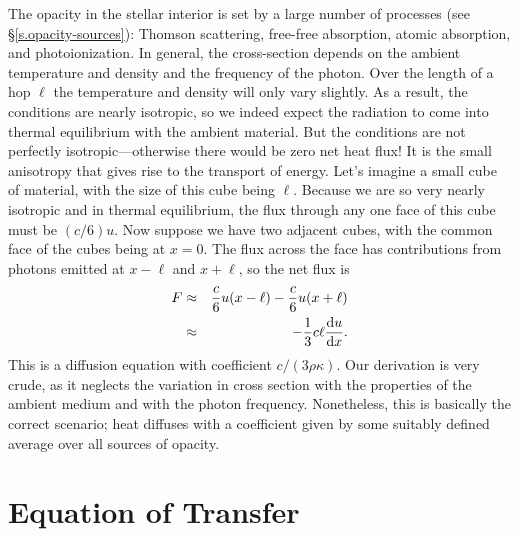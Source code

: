 The opacity in the stellar interior is set by a large number of processes (see \S\ref{s.opacity-sources}): Thomson scattering, free-free absorption, atomic absorption, and photoionization.  In general, the cross-section depends on the ambient temperature and density and the frequency of the photon. 
Over the length of a hop $\ell$ the temperature and density will only vary slightly.  As a result, the conditions are nearly isotropic, so we indeed expect the radiation to come into thermal equilibrium with the ambient material.  But the conditions are not perfectly isotropic---otherwise there would be zero net heat flux!  It is the small anisotropy that gives rise to the transport of energy.  Let's imagine a small cube of material, with the size of this cube being $\ell$.  Because we are so very nearly isotropic and in thermal equilibrium, the flux through any one face of this cube must be $(c/6)u$.  Now suppose we have two adjacent cubes, with the common face of the cubes being at $x=0$.  The flux across the face has contributions from photons emitted at $x-\ell$ and $x+\ell$, so the net flux is
\begin{eqnarray}
	F &\approx& \frac{c}{6} u(x-\ell) - \frac{c}{6} u (x+\ell)\nonumber \\
	&\approx& -\frac{1}{3}c\ell\frac{\mathrm{d} u}{\mathrm{d} x}.\label{e.rad-diffusion-simple}
\end{eqnarray}
This is a diffusion equation with coefficient $c/(3\rho\kappa)$.  Our derivation is very crude, as it neglects the variation in cross section with the properties of the ambient medium and with the photon frequency.  Nonetheless, this is basically the correct scenario; heat diffuses with a coefficient given by some suitably defined average over all sources of opacity. 

\section{Equation of Transfer}

